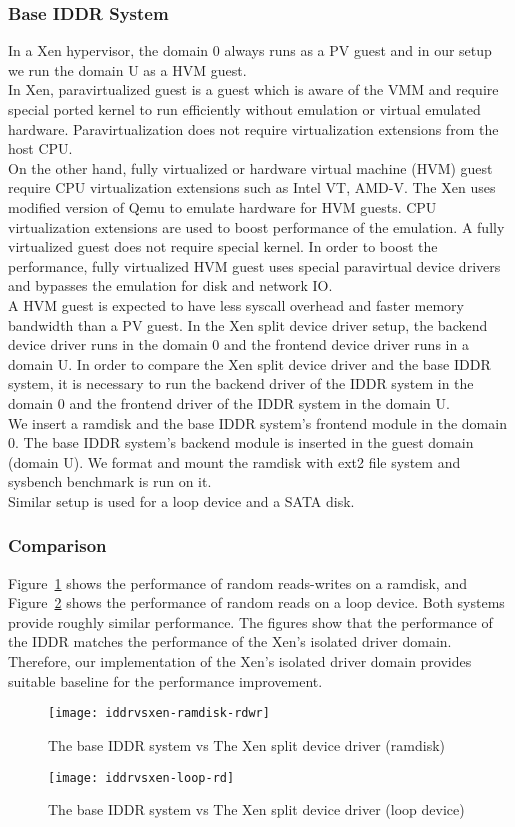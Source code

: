 \subsubsection*{Base IDDR System}
In a Xen hypervisor, the domain 0 always runs as a PV guest and in our setup we run the domain U as a HVM guest.
\\[3mm] 
In Xen, paravirtualized guest is a guest which is aware of the VMM and require special ported kernel to run efficiently without emulation or virtual emulated hardware. Paravirtualization does not require virtualization extensions from the host CPU. 
\\[3mm]
On the other hand, fully virtualized or hardware virtual machine (HVM) guest require CPU virtualization extensions such as Intel VT, AMD-V. The Xen uses modified version of Qemu to emulate hardware for HVM guests. CPU virtualization extensions are used to boost performance of the emulation. A fully virtualized guest does not require special kernel. In order to boost the performance, fully virtualized HVM guest uses special paravirtual device drivers and bypasses the emulation for disk and network IO.
\\[3mm]
A HVM guest is expected to have less syscall overhead and faster memory bandwidth than a PV guest. In the Xen split device driver setup, the backend device driver runs in the domain 0 and the frontend device driver runs in a domain U. In order to compare the Xen split device driver and the base IDDR system, it is necessary to run the backend driver of the IDDR system in the domain 0 and the frontend driver of the IDDR system in the domain U.
\\[3mm]
We insert a ramdisk and the base IDDR system's frontend module in the domain 0. The base IDDR system's backend module is inserted in the guest domain (domain U). We format and mount the ramdisk with ext2 file system and sysbench benchmark is run on it.  
\\[3mm]
Similar setup is used for a loop device and a SATA disk.
\subsubsection*{Comparison}
Figure~\ref{fig:iddrvsxen-ramdisk-rdwr} shows the performance of random reads-writes on a ramdisk, and Figure~\ref{fig:iddrvsxen-loop-rd} shows the performance of random reads on a loop device. Both systems provide roughly similar performance. The figures show that the performance of the IDDR matches the performance of the Xen's isolated driver domain. Therefore, our implementation of the Xen's isolated driver domain provides suitable baseline for the performance improvement.
\begin{figure}[!ht]
\centering
\texttt{[image: iddrvsxen-ramdisk-rdwr]}
\caption{The base IDDR system vs The Xen split device driver (ramdisk)}
\label{fig:iddrvsxen-ramdisk-rdwr}
\end{figure}
\begin{figure}[!ht]
\centering
\texttt{[image: iddrvsxen-loop-rd]}
\caption{The base IDDR system vs The Xen split device driver (loop device)}
\label{fig:iddrvsxen-loop-rd}
\end{figure}

